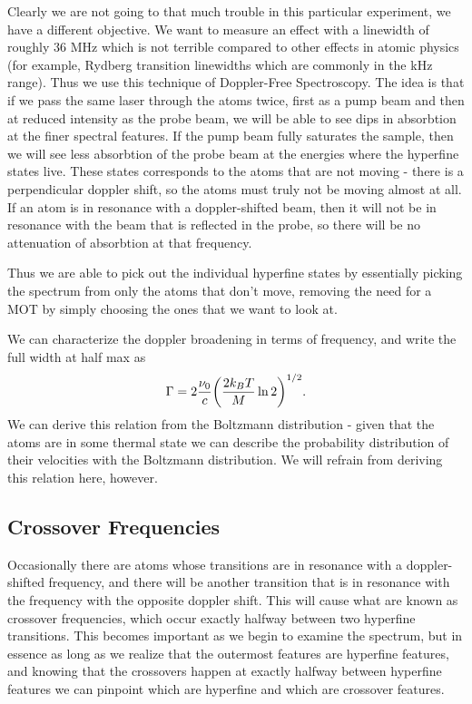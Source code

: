 \documentclass{article}
\DeclarePairedDelimiter{\parens}{\lparen}{\rparen}
\begin{document}
  Clearly we are not going to that much trouble in this particular experiment, we have a different objective.  We want to measure an effect with a linewidth of roughly 36 MHz which is not terrible compared to other effects in atomic physics (for example, Rydberg transition linewidths which are commonly in the kHz range).  Thus we use this technique of Doppler-Free Spectroscopy.  The idea is that if we pass the same laser through the atoms twice, first as a pump beam and then at reduced intensity as the probe beam, we will be able to see dips in absorbtion at the finer spectral features.  If the pump beam fully saturates the sample, then we will see less absorbtion of the probe beam at the energies where the hyperfine states live.  These states corresponds to the atoms that are not moving - there is a perpendicular doppler shift, so the atoms must truly not be moving almost at all.  If an atom is in resonance with a doppler-shifted beam, then it will not be in resonance with the beam that is reflected in the probe, so there will be no attenuation of absorbtion at that frequency.

  \hspace{.25cm}

  Thus we are able to pick out the individual hyperfine states by essentially picking the spectrum from only the atoms that don't move, removing the need for a MOT by simply choosing the ones that we want to look at.

  \hspace{.25cm}

  We can characterize the doppler broadening in terms of frequency, and write the full width at half max as
  \begin{equation}
    \Gamma = 2\frac{\nu_0}{c}\parens*{\frac{2k_BT}{M}\ln{2}}^{1/2}.
    \label{doppler}
  \end{equation}
  We can derive this relation from the Boltzmann distribution - given that the atoms are in some thermal state we can describe the probability distribution of their velocities with the Boltzmann distribution.  We will refrain from deriving this relation here, however.

  \subsection{Crossover Frequencies}
  Occasionally there are atoms whose transitions are in resonance with a doppler-shifted frequency, and there will be another transition that is in resonance with the frequency with the opposite doppler shift.  This will cause what are known as crossover frequencies, which occur exactly halfway between two hyperfine transitions.  This becomes important as we begin to examine the spectrum, but in essence as long as we realize that the outermost features are hyperfine features, and knowing that the crossovers happen at exactly halfway between hyperfine features we can pinpoint which are hyperfine and which are crossover features.
\end{document}
